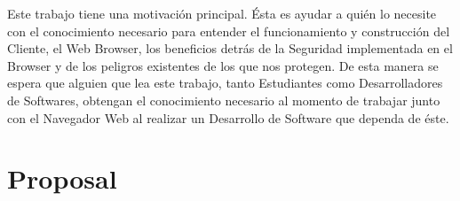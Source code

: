 Este trabajo tiene una motivación principal. Ésta es ayudar a quién lo necesite con el conocimiento necesario para entender el funcionamiento y construcción del Cliente, el Web Browser, los beneficios detrás de la Seguridad implementada en el Browser y de los peligros existentes de los que nos protegen. De esta manera se espera que alguien que lea este trabajo, tanto Estudiantes como Desarrolladores de Softwares, obtengan el conocimiento necesario al momento de trabajar junto con el Navegador Web al realizar un Desarrollo de Software que dependa de éste.



\section{Proposal}
\label{chap1:contr}



	

